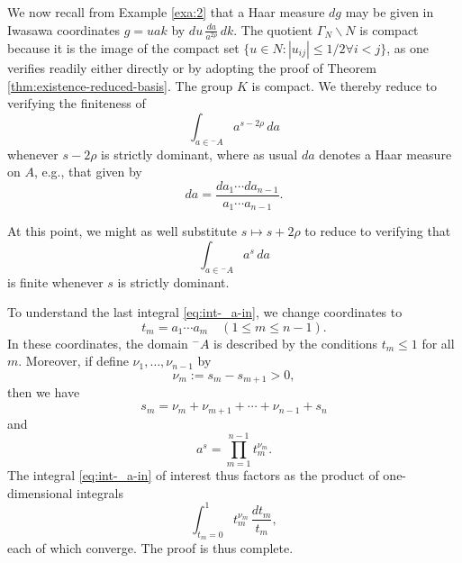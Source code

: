 \documentclass[reqno]{amsart} 
\begin{document}
We now recall from Example \ref{exa:2} that a Haar measure $d g$ may be given in Iwasawa coordinates $g = u a k$ by $d u \, \frac{d a}{a^{2 \rho}} \, d k$.  The quotient $\Gamma_N \backslash N$ is compact because it is the image of the compact set $\{u \in N : |u_{i j}| \leq 1/2 \forall i < j\}$, as one verifies readily either directly or by adopting the proof of Theorem \ref{thm:existence-reduced-basis}.  The group $K$ is compact.  We thereby reduce to verifying the finiteness of
\begin{equation}
  \int _{a \in {}^- A}
  a^{s - 2 \rho}
  \, d a
\end{equation}
whenever $s - 2 \rho$ is strictly dominant, where as usual $d a$ denotes a Haar measure on $A$, e.g., that given by
\begin{equation*}
  d a = \frac{d a _1 \dotsb d a _{n - 1}}{a_1 \dotsb a_{n-1}}.
\end{equation*}

At this point, we might as well substitute $s \mapsto s + 2 \rho$ to reduce to verifying that
\begin{equation}\label{eq:int-_a-in}
  \int _{a \in {}^- A}
  a^{s}
  \, d a
\end{equation}
is finite whenever $s$ is strictly dominant.

To understand the last integral \eqref{eq:int-_a-in}, we change coordinates to
\begin{equation*}
  t_m = a_1 \dotsb a_m \quad (1 \leq m \leq n - 1 ).
\end{equation*}
In these coordinates, the domain ${}^- A$ is described by the conditions $t_m \leq 1$ for all $m$.  Moreover, if define $\nu_1, \dotsc, \nu_{n-1}$ by
\begin{equation*}
  \nu_m := s_m - s_{m+1} > 0,
\end{equation*}
then we have
\begin{equation*}
  s_m = \nu_m + \nu_{m+1} + \dotsb + \nu_{n-1} + s_n
\end{equation*}
and
\begin{equation*}
  a^s = \prod_{m=1}^{n-1} t_m^{\nu_m}.
\end{equation*}
The integral \eqref{eq:int-_a-in} of interest thus factors as the product of one-dimensional integrals
\begin{equation*}
  \int _{t_m = 0}^1 t_m^{\nu_m} \, \frac{d t_m}{t_m},
\end{equation*}
each of which converge.  The proof is thus complete.
\end{document}
